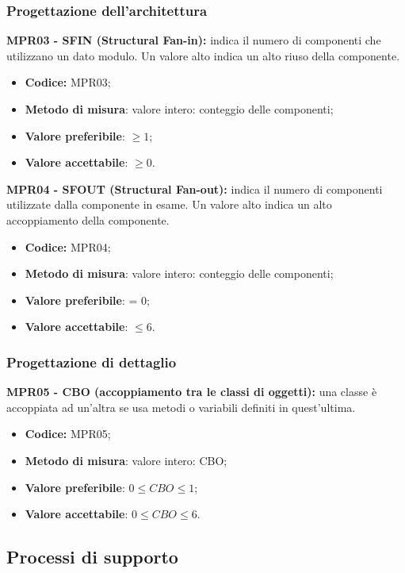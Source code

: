 \subsubsection{Progettazione dell'architettura}
\textbf{MPR03 - SFIN (Structural Fan-in):} indica il numero di componenti che utilizzano un dato modulo. Un valore alto indica un alto riuso della componente.
\begin{itemize}
    \item \textbf{Codice:} MPR03;
    \item \textbf{Metodo di misura}: valore intero: conteggio delle componenti;
    \item \textbf{Valore preferibile}: $\geq 1$;
    \item \textbf{Valore accettabile}: $\geq 0$.
\end{itemize}
\textbf{MPR04 - SFOUT (Structural Fan-out):} indica il numero di componenti utilizzate dalla componente in esame. Un valore alto indica un alto accoppiamento della componente.
\begin{itemize}
    \item \textbf{Codice:} MPR04;
    \item \textbf{Metodo di misura}: valore intero: conteggio delle componenti;
    \item \textbf{Valore preferibile}: = 0;
    \item \textbf{Valore accettabile}: $\leq 6$.
\end{itemize}
\subsubsection{Progettazione di dettaglio}
\textbf{MPR05 - CBO (accoppiamento tra le classi di oggetti):} una classe è accoppiata ad un'altra se usa metodi o variabili definiti in quest'ultima.
\begin{itemize}
    \item \textbf{Codice:} MPR05;
    \item \textbf{Metodo di misura}: valore intero: CBO;
    \item \textbf{Valore preferibile}: $0 \leq CBO \leq 1$;
    \item \textbf{Valore accettabile}: $0 \leq CBO \leq 6$.
\end{itemize}
\subsection{Processi di supporto}
